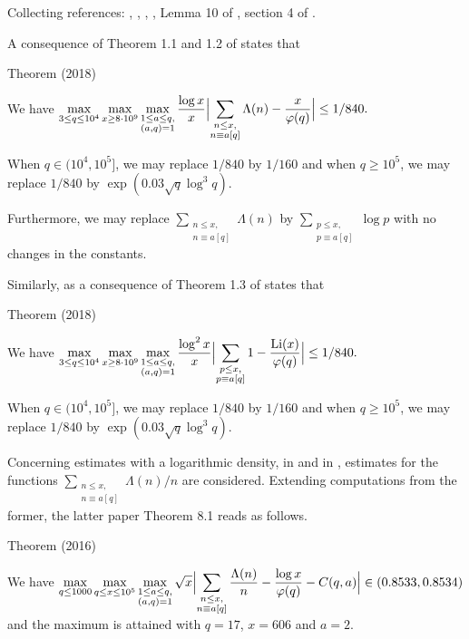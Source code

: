 Collecting references:
\cite{McCurley*84-2},
\cite{McCurley*84-3},
\cite{Ramare-Rumely*96},
\cite{Dusart*01},
Lemma 10 of \cite{Moree*04},
section 4 of
\cite{Moree-teRiele*04}.

A consequence of Theorem 1.1 and 1.2 of
\cite{Bennett-Martin-OBryant-Rechnitzer*18}
states that
\begin{thm}{Theorem (2018)}

  We have
  $\displaystyle
  \max_{3\le q\le 10^4}\max_{ x\ge 8\cdot 10^9}\max_{\substack{1\le a\le q,\\
  (a,q)=1}}
  \frac{\log x}{x}\Bigl|
  \sum_{\substack{n\le x,\\ n\equiv a[q]}}\Lambda(n)
  -\frac{x}{\varphi(q)}\Bigr|\le 1/840.
  $
  \par 
  When $q\in(10^4, 10^5]$, we may replace $1/840$ by $1/160$ and when
  $q\ge 10^5$, we may replace $1/840$ by $\exp(0.03\sqrt{q}\log^3q)$.
  \par 
    Furthermore, we may replace
  $\sum_{\substack{n\le x,\\ n\equiv a[q]}}\Lambda(n)$ by
  $\sum_{\substack{p\le x,\\ p\equiv a[q]}}\log p$ with no changes in
  the constants. 
\end{thm}

Similarly, as a consequence of Theorem 1.3 of
\cite{Bennett-Martin-OBryant-Rechnitzer*18}
states that
\begin{thm}{Theorem (2018)}

  We have
  $\displaystyle
  \max_{3\le q\le 10^4}\max_{ x\ge 8\cdot 10^9}\max_{\substack{1\le a\le q,\\
  (a,q)=1}}
  \frac{\log^2 x}{x}\Bigl|
  \sum_{\substack{p\le x,\\ p\equiv a[q]}}1
  -\frac{\textrm{Li}(x)}{\varphi(q)}\Bigr|\le 1/840.
  $
  \par 
  When $q\in(10^4, 10^5]$, we may replace $1/840$ by $1/160$ and when
  $q\ge 10^5$, we may replace $1/840$ by $\exp(0.03\sqrt{q}\log^3q)$.
\end{thm}





\par 
Concerning estimates with a logarithmic density, in
\cite{Ramare*02}
and in
\cite{Ramare*12-0},
estimates for the functions
$\displaystyle\sum_{\substack{n\le x,\\ n\equiv a[q]}}\Lambda(n)/n$
are considered.
Extending computations from the former, the latter paper Theorem 8.1
reads as follows.
\begin{thm}{Theorem (2016)}

  We have
  $\displaystyle
  \max_{q\le 1000}\max_{q\le x\le 10^5}\max_{\substack{1\le a\le q,\\
  (a,q)=1}}
  \sqrt{x}\Bigl|
  \sum_{\substack{n\le x,\\ n\equiv a[q]}}\frac{\Lambda(n)}{n}
  -\frac{\log x}{\varphi(q)}-C(q,a)\Bigr|\in(0.8533,0.8534)
  $
  and the maximum is attained with $q=17$, $x=606$ and $a=2$.
\end{thm}

